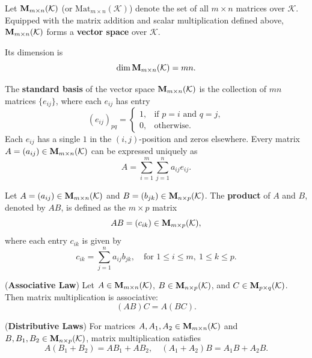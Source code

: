 \begin{remarkenv}
	Let $\mathbf{M}_{m \times n}(\mathcal{K})$ (or $\mathrm{Mat}_{m \times n}(\mathcal{K})$) denote the set of all $m \times n$ matrices over $\mathcal{K}$.
	Equipped with the matrix addition and scalar multiplication defined above,
	$\mathbf{M}_{m \times n}(\mathcal{K})$ forms a \textbf{vector space} over $\mathcal{K}$.

	Its dimension is
	\[
	\dim \mathbf{M}_{m \times n}(\mathcal{K}) = m n.
	\]
\end{remarkenv}

\begin{definitionenv}
	The \textbf{standard basis} of the vector space $\mathbf{M}_{m \times n}(\mathcal{K})$
	is the collection of $m n$ matrices $\{e_{ij}\}$, where each $e_{ij}$ has entry
	\[
	(e_{ij})_{pq} =
	\begin{cases}
		1, & \text{if } p = i \text{ and } q = j,\\
		0, & \text{otherwise}.
	\end{cases}
	\]
	Each $e_{ij}$ has a single $1$ in the $(i,j)$-position and zeros elsewhere.
	Every matrix $A = (a_{ij}) \in \mathbf{M}_{m \times n}(\mathcal{K})$ can be expressed uniquely as
	\[
	A = \sum_{i=1}^{m} \sum_{j=1}^{n} a_{ij} e_{ij}.
	\]
\end{definitionenv}

\begin{definitionenv}
	Let $A = (a_{ij}) \in \mathbf{M}_{m \times n}(\mathcal{K})$ and
	$B = (b_{jk}) \in \mathbf{M}_{n \times p}(\mathcal{K})$.
	The \textbf{product} of $A$ and $B$, denoted by $AB$, is defined as the $m \times p$ matrix
	\[
	AB = (c_{ik}) \in \mathbf{M}_{m \times p}(\mathcal{K}),
	\]
	where each entry $c_{ik}$ is given by
	\[
	c_{ik} = \sum_{j=1}^{n} a_{ij} b_{jk},
	\quad \text{for } 1 \leq i \leq m, \ 1 \leq k \leq p.
	\]
\end{definitionenv}

\begin{theoremenv}
	(\textbf{Associative Law})
	Let $A \in \mathbf{M}_{m \times n}(\mathcal{K})$,
	$B \in \mathbf{M}_{n \times p}(\mathcal{K})$,
	and $C \in \mathbf{M}_{p \times q}(\mathcal{K})$.
	Then matrix multiplication is associative:
	\[
	(AB)C = A(BC).
	\]
\end{theoremenv}

\begin{theoremenv}
	(\textbf{Distributive Laws})
	For matrices $A, A_1, A_2 \in \mathbf{M}_{m \times n}(\mathcal{K})$
	and $B, B_1, B_2 \in \mathbf{M}_{n \times p}(\mathcal{K})$,
	matrix multiplication satisfies
	\[
	A(B_1 + B_2) = AB_1 + AB_2,
	\quad (A_1 + A_2)B = A_1B + A_2B.
	\]
\end{theoremenv}

